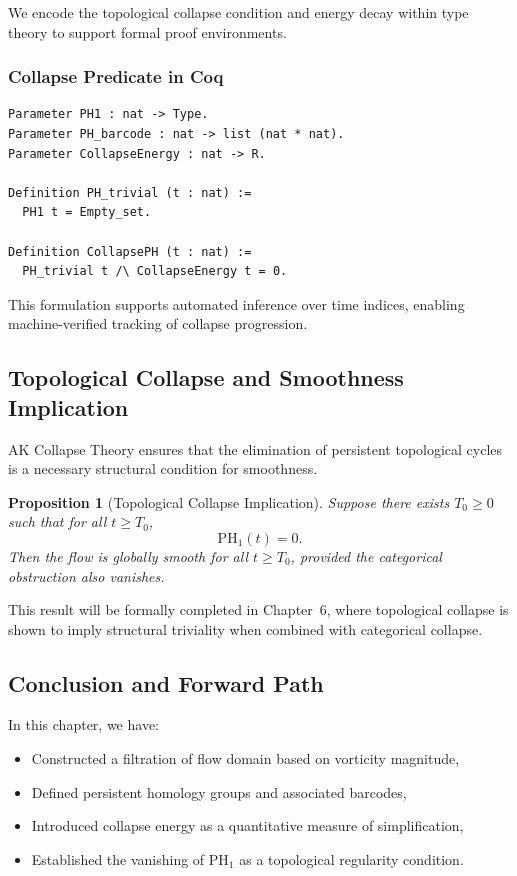 \documentclass[11pt]{article}
\newtheorem{proposition}[theorem]{Proposition}
\begin{document}
We encode the topological collapse condition and energy decay within type theory to support formal proof environments.

\subsubsection*{Collapse Predicate in Coq}
\begin{lstlisting}
Parameter PH1 : nat -> Type.
Parameter PH_barcode : nat -> list (nat * nat).
Parameter CollapseEnergy : nat -> R.

Definition PH_trivial (t : nat) :=
  PH1 t = Empty_set.

Definition CollapsePH (t : nat) :=
  PH_trivial t /\ CollapseEnergy t = 0.
\end{lstlisting}

This formulation supports automated inference over time indices, enabling machine-verified tracking of collapse progression.

\subsection{Topological Collapse and Smoothness Implication}

AK Collapse Theory ensures that the elimination of persistent topological cycles is a necessary structural condition for smoothness.

\begin{proposition}[Topological Collapse Implication]
\label{prop:PH-collapse}
Suppose there exists \( T_0 \geq 0 \) such that for all \( t \geq T_0 \),
\[
\mathrm{PH}_1(t) = 0.
\]
Then the flow is globally smooth for all \( t \geq T_0 \), provided the categorical obstruction also vanishes.
\end{proposition}

This result will be formally completed in Chapter~6, where topological collapse is shown to imply structural triviality when combined with categorical collapse.

\subsection{Conclusion and Forward Path}

In this chapter, we have:
\begin{itemize}
  \item Constructed a filtration of flow domain based on vorticity magnitude,
  \item Defined persistent homology groups and associated barcodes,
  \item Introduced collapse energy as a quantitative measure of simplification,
  \item Established the vanishing of \( \mathrm{PH}_1 \) as a topological regularity condition.
\end{itemize}
\end{document}
